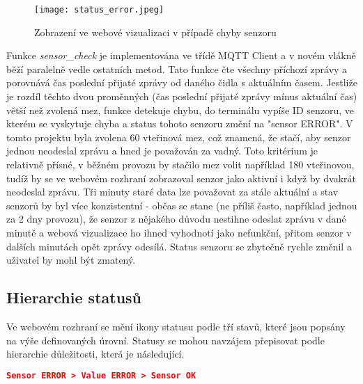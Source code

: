 \begin{figure}[H]
  \centering
  \texttt{[image: status\_error.jpeg]}
  \caption{Zobrazení ve webové vizualizaci v případě chyby senzoru}
  \label{fig:status_error}
\end{figure} 

Funkce \textit{sensor\_check} je implementována ve třídě MQTT Client a v novém vlákně běží paralelně vedle ostatních metod. Tato funkce čte všechny příchozí zprávy a porovnává čas poslední přijaté zprávy od daného čidla s aktuálním časem. Jestliže je rozdíl těchto dvou proměnných (čas poslední přijaté zprávy mínus aktuální čas) větší než zvolená mez, funkce detekuje chybu, do terminálu vypíše ID senzoru, ve kterém se vyskytuje chyba a status tohoto senzoru změní na "sensor ERROR". V tomto projektu byla zvolena 60 vteřinová mez, což znamená, že stačí, aby senzor jednou neodeslal zprávu a hned je považován za vadný. Toto kritérium je relativně přísné, v běžném provozu by stačilo mez volit například 180 vteřinovou, tudíž by se ve webovém rozhraní zobrazoval senzor jako aktivní i když by dvakrát neodeslal zprávu. Tři minuty staré data lze považovat za stále aktuální a stav senzorů by byl více konzistentní - občas se stane (ne příliš často, například jednou za 2 dny provozu), že senzor z nějakého důvodu nestihne odeslat zprávu v dané minutě a webová vizualizace ho ihned vyhodnotí jako nefunkční, přitom senzor v dalších minutách opět zprávy odesílá. Status senzoru se zbytečně rychle změnil a uživatel by mohl být zmatený. 

\subsection*{Hierarchie statusů}
Ve webovém rozhraní se mění ikony statusu podle tří stavů, které jsou popsány na výše definovaných úrovní. Statusy se mohou navzájem přepisovat podle hierarchie důležitosti, která je následující. 

\begin{lstlisting}[language=json]
	   Sensor ERROR > Value ERROR > Sensor OK
\end{lstlisting}

